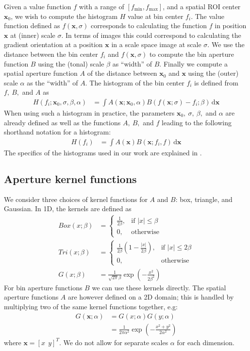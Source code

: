 \documentclass[thesis.tex]{subfiles}
\def\x{\mathbf{x}}
\begin{document}
Given a value function $f$ with a range of $[f_\text{min},f_\text{max}]$, and a spatial ROI center $\x_0$, we wish to compute the histogram $H$ value at bin center $f_i$.
The value function defined as $f(\x,\sigma)$ corresponds to calculating the function $f$ in position $\x$ at (inner) scale $\sigma$. In terms of images this could correspond to calculating the gradient orientation at a position $\x$ in a scale space image at scale $\sigma$.
We use the distance between the bin center $f_i$ and $f(\x,\sigma)$ to compute the bin aperture function $B$ using the (tonal) scale $\beta$ as ``width'' of $B$. Finally we compute a spatial aperture function $A$ of the distance between $\x_0$ and $\x$ using the (outer) scale $\alpha$ as the ``width'' of $A$. The histogram of the bin center $f_i$ is defined from $f,~B,$ and $A$ as
%
\begin{align}
	\label{eq:histogramLong}
	H(f_i;\x_0,\sigma,\beta,\alpha) &= \int A(\x;\x_0,\alpha) B(f(\x;\sigma)-f_i;\beta)\,\text{d}\x
\end{align}
%
When using such a histogram in practice, the parameters $\x_0,~\sigma,~\beta,$ and $\alpha$ are already defined as well as the functions $A,~B,$ and $f$ leading to the following shorthand notation for a histogram:
%
\begin{align}
	\label{eq:histogramShort}
	H(f_i) &= \int A(\x) B(\x;f_i,f)\,\text{d}\x
\end{align}
%
The specifics of the histograms used in our work are explained in .
%
\subsection{Aperture kernel functions}
\label{sec:apertureKernelFunctions}
%
We consider three choices of kernel functions for $A$ and $B$: box, triangle, and Gaussian. In 1D, the kernels are defined as
%
\begin{align*}
\mathit{Box} (x; \beta) &= 
\begin{cases}
    \frac{1}{2 \beta},& \text{if } |x| \leq \beta \\
    0,              & \text{otherwise}
\end{cases} \\
\mathit{Tri} (x; \beta) &= 
\begin{cases}
    \frac{1}{2 \beta} \left( 1 - \frac{| x |}{2 \beta} \right) ,& \text{if } |x| \leq 2 \beta \\
    0,              & \text{otherwise}
\end{cases} \\
G(x;\beta) &= \frac{1}{\sqrt{2\pi} \beta}
\exp\left( -\frac{x^2}{2 \beta^2} \right)
\end{align*}
%
For bin aperture functions $B$ we can use these kernels directly. The spatial aperture functions $A$ are however defined on a 2D domain; this is handled by multiplying two of the same kernel functions together, e.g:
%
\begin{align*}
G(\x;\alpha) &= G(x;\alpha) G(y;\alpha) \\
&= \frac{1}{2\pi \alpha^2}
\exp\left( -\frac{x^2 + y^2}{2 \alpha^2} \right)
\end{align*}
%
where $\x = [x ~~ y]^T$. We do not allow for separate scales $\alpha$ for each dimension.
%
\end{document}
